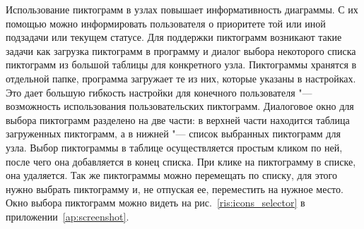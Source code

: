 Использование пиктограмм в узлах повышает информативность диаграммы. С их помощью можно информировать пользователя о приоритете той или иной подзадачи или текущем статусе.
Для поддержки пиктограмм возникают такие задачи как загрузка пиктограмм в программу и диалог выбора некоторого списка пиктограмм из большой таблицы для конкретного узла.
Пиктограммы хранятся в отдельной папке, программа загружает те из них, которые указаны в настройках. Это дает большую гибкость настройки для конечного пользователя "--- возможность использования пользовательских пиктограмм.
Диалоговое окно для выбора пиктограмм разделено на две части: в верхней части находится таблица загруженных пиктограмм, а в нижней "--- список выбранных пиктограмм для узла. Выбор пиктограммы в таблице осуществляется простым кликом по ней, после чего она добавляется в конец списка.
При клике на пиктограмму в списке, она удаляется. Так же пиктограммы можно перемещать по списку, для этого нужно выбрать пиктограмму и, не отпуская ее, переместить на нужное место. Окно выбора пиктограмм можно видеть на рис.~\ref{ris:icons_selector} в приложении~\ref{ap:screenshot}.